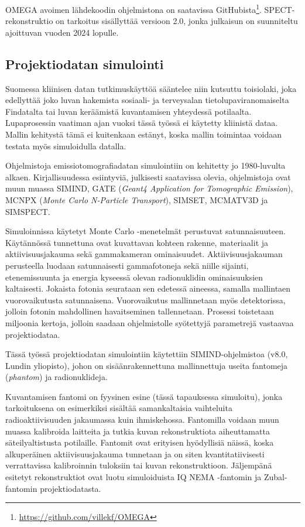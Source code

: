 OMEGA avoimen lähdekoodin ohjelmistona on saatavissa GitHubista\footnote{\url{https://github.com/villekf/OMEGA}}. SPECT-rekonstruktio on tarkoitus sisällyttää versioon 2.0, jonka julkaisun on suunniteltu ajoittuvan vuoden 2024 lopulle.

\subsection{Projektiodatan simulointi}
Suomessa kliinisen datan tutkimuskäyttöä sääntelee niin kutsuttu toisiolaki, joka edellyttää joko luvan hakemista sosiaali- ja terveysalan tietolupaviranomaiselta Findatalta tai luvan keräämistä kuvantamisen yhteydessä potilaalta. Lupaprosessin vaatiman ajan vuoksi tässä työssä ei käytetty kliinistä dataa. Mallin kehitystä tämä ei kuitenkaan estänyt, koska mallin toimintaa voidaan testata myös simuloidulla datalla.

Ohjelmistoja emissiotomografiadatan simulointiin on kehitetty jo 1980-luvulta alkaen\cite{ljungberg_monte_1989}. Kirjallisuudessa esiintyviä, julkisesti saatavissa olevia, ohjelmistoja ovat muun muassa SIMIND\cite{ljungberg_monte_1989, taheri_monte_2017, giannone_monte_1999}, GATE (\textit{Geant4 Application for Tomographic Emission})\cite{jan_gate_2004, taheri_monte_2017}, MCNPX (\textit{Monte Carlo N-Particle Transport})\cite{taheri_monte_2017}, SIMSET\cite{giannone_monte_1999}, MCMATV3D\cite{giannone_monte_1999} ja SIMSPECT\cite{giannone_monte_1999}.

Simuloinnissa käytetyt Monte Carlo -menetelmät perustuvat satunnaisuuteen. Käytännössä tunnettuna ovat kuvattavan kohteen rakenne, materiaalit ja aktiivisuusjakauma sekä gammakameran ominaisuudet. Aktiivisuusjakauman perusteella luodaan satunnaisesti gammafotoneja sekä niille sijainti, etenemissuunta ja energia kyseessä olevan radionuklidin ominaisuuksien kaltaisesti. Jokaista fotonia seurataan sen edetessä aineessa, samalla mallintaen vuorovaikutusta satunnaisena. Vuorovaikutus mallinnetaan myös detektorissa, jolloin fotonin mahdollinen havaitseminen tallennetaan. Prosessi toistetaan miljoonia kertoja, jolloin saadaan ohjelmistolle syötettyjä parametrejä vastaavaa projektiodataa.\cite{ljungberg_monte_1989}

Tässä työssä projektiodatan simulointiin käytettiin SIMIND-ohjelmistoa (v8.0, Lundin yliopisto)\cite{ljungberg_monte_1989}, johon on sisäänrakennettuna mallinnettuja useita fantomeja (\textit{phantom}) ja radionuklideja.

Kuvantamisen fantomi on fyysinen esine (tässä tapauksessa simuloitu), jonka tarkoituksena on esimerkiksi sisältää samankaltaisia vaihteluita radioaktiivisuuden jakaumassa kuin ihmiskehossa. Fantomilla voidaan muun muassa kalibroida laitteita ja tutkia kuvan rekonstruktiota aiheuttamatta säteilyaltistusta potilaille. Fantomit ovat erityisen hyödyllisiä näissä, koska alkuperäinen aktiivisuusjakauma tunnetaan ja on siten kvantitatiivisesti verrattavissa kalibroinnin tuloksiin tai kuvan rekonstruktioon. Jäljempänä esitetyt rekonstruktiot ovat luotu simuloiduista IQ NEMA -fantomin\cite{nema2018} ja Zubal-fantomin\cite{zubal_computerized_1994} projektiodatasta.

